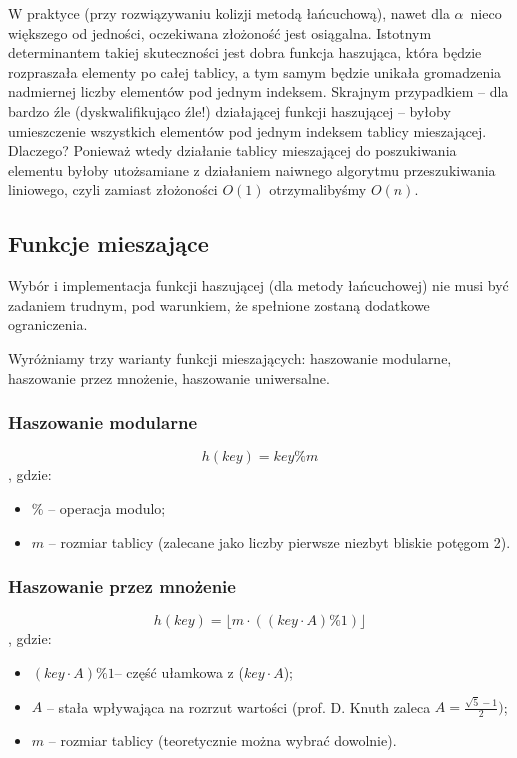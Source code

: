 \documentclass[twoside]{article}
\begin{document}
W praktyce (przy rozwiązywaniu kolizji metodą łańcuchową), nawet dla $\alpha$~nieco większego od
jedności, oczekiwana złożoność jest osiągalna.
Istotnym determinantem takiej skuteczności jest dobra funkcja haszująca, która będzie rozpraszała
elementy po całej tablicy, a tym samym będzie unikała gromadzenia nadmiernej liczby elementów
pod jednym indeksem.
Skrajnym przypadkiem -- dla bardzo źle (dyskwalifikująco źle!) działającej funkcji haszującej -- 
byłoby umieszczenie wszystkich elementów pod jednym indeksem tablicy mieszającej. 
Dlaczego?
Ponieważ wtedy działanie tablicy mieszającej do poszukiwania elementu byłoby utożsamiane
z działaniem naiwnego algorytmu przeszukiwania liniowego, czyli zamiast złożoności $O(1)$
otrzymalibyśmy $O(n)$.

\subsection{Funkcje mieszające}
Wybór i implementacja funkcji haszującej (dla metody łańcuchowej) nie musi być zadaniem
trudnym, pod warunkiem, że spełnione zostaną dodatkowe ograniczenia.

Wyróżniamy trzy warianty funkcji mieszających: haszowanie modularne, haszowanie przez mnożenie,
haszowanie uniwersalne.

\subsubsection{Haszowanie modularne}
$$h(key)=key \% m$$
, gdzie:

\begin{itemize}
    \item $\%$ -- operacja modulo;
    \item $m$ -- rozmiar tablicy (zalecane jako liczby pierwsze niezbyt bliskie potęgom 2).
\end{itemize}

\subsubsection{Haszowanie przez mnożenie}
$$h(key)=\lfloor m \cdot ((key \cdot A) \% 1) \rfloor$$
, gdzie: 

\begin{itemize}
    \item $(key \cdot A) \% 1$-- część ułamkowa z ($key \cdot A$);
    \item $A$ -- stała wpływająca na rozrzut wartości (prof. D. Knuth zaleca
    $A=\frac{\sqrt{5}-1}{2})$;
    \item $m$ -- rozmiar tablicy (teoretycznie można wybrać dowolnie).
\end{itemize}
\end{document}
